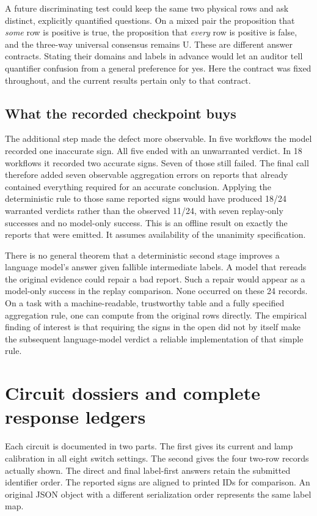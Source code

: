 \documentclass[12pt,letterpaper]{article}
\begin{document}
A future discriminating test could keep the same two physical rows and ask distinct, explicitly quantified questions. On a mixed pair the proposition that \emph{some} row is positive is true, the proposition that \emph{every} row is positive is false, and the three-way universal consensus remains U. These are different answer contracts. Stating their domains and labels in advance would let an auditor tell quantifier confusion from a general preference for yes. Here the contract was fixed throughout, and the current results pertain only to that contract.

\subsection{What the recorded checkpoint buys}
The additional step made the defect more observable. In five workflows the model recorded one inaccurate sign. All five ended with an unwarranted verdict. In 18 workflows it recorded two accurate signs. Seven of those still failed. The final call therefore added seven observable aggregation errors on reports that already contained everything required for an accurate conclusion. Applying the deterministic rule to those same reported signs would have produced 18/24 warranted verdicts rather than the observed 11/24, with seven replay-only successes and no model-only success. This is an offline result on exactly the reports that were emitted. It assumes availability of the unanimity specification.

There is no general theorem that a deterministic second stage improves a language model's answer given fallible intermediate labels. A model that rereads the original evidence could repair a bad report. Such a repair would appear as a model-only success in the replay comparison. None occurred on these 24 records. On a task with a machine-readable, trustworthy table and a fully specified aggregation rule, one can compute from the original rows directly. The empirical finding of interest is that requiring the signs in the open did not by itself make the subsequent language-model verdict a reliable implementation of that simple rule.


\clearpage\section{Circuit dossiers and complete response ledgers}
Each circuit is documented in two parts. The first gives its current and lamp calibration in all eight switch settings. The second gives the four two-row records actually shown. The direct and final label-first answers retain the submitted identifier order. The reported signs are aligned to printed IDs for comparison. An original JSON object with a different serialization order represents the same label map.
\end{document}
